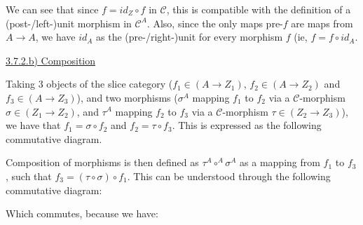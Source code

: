 \documentclass[12pt, letterpaper, twoside]{report}
\begin{document}
We can see that since $f = id_Z \circ f$ in $\mathcal{C}$, this is compatible with the definition of a (post-/left-)unit morphism in $\mathcal{C}^A$. Also, since the only maps pre-$f$ are maps from $A \to A$, we have $id_A$ as the (pre-/right-)unit for every morphism $f$ (ie, $f = f \circ id_A$. 

\vspace{5mm}
\underline{3.7.2.b) Composition}

Taking 3 objects of the slice category ($f_1 \in (A \to Z_1)$, $f_2 \in (A \to Z_2)$ and $f_3 \in (A \to Z_3)$), and two morphisms ($\sigma^A$ mapping $f_1$ to $f_2$ via a $\mathcal{C}$-morphism $\sigma \in (Z_1 \to Z_2)$, and $\tau^A$ mapping $f_2$ to $f_3$ via a $\mathcal{C}$-morphism $\tau \in (Z_2 \to Z_3)$), we have that $f_1 = \sigma \circ f_2$ and $f_2 = \tau  \circ f_3$. This is expressed as the following commutative diagram.


Composition of morphisms is then defined as $\tau^A \circ^A \sigma^A$ as a mapping from $f_1$ to $f_3$, such that $f_3 = (\tau \circ \sigma) \circ f_1$. This can be understood through the following commutative diagram:


Which commutes, because we have:
\end{document}
